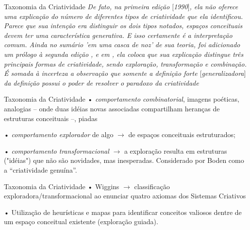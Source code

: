 \documentclass[aspectratio=169]{beamer}
\begin{document}
\begin{frame}{Taxonomia da Criatividade}
\emph{De fato, na primeira edição $[$1990$]$, ela não oferece uma explicação do número de diferentes tipos de criatividade que ela identificou. Parece que sua intenção era distinguir os dois tipos notados, espaços conceituais devem ter uma característica generativa. E isso certamente é a interpretação comum. Ainda no sumário 'em uma casca de noz' de sua teoria, foi adicionado um prólogo à segunda edição \cite{boden_creative_1990}, e em , ela coloca que sua explicação distingue três principais formas de criatividade, sendo exploração, transformação e \emph{combinação}. É somada à incerteza a observação que somente a definição forte $[$generalizadora$]$ da definição possui o poder de resolver o paradoxo da criatividade}
\end{frame}

\begin{frame}{Taxonomia da Criatividade}
• \emph{comportamento combinatorial}, imagens poéticas, analogias -- onde duas idéias novas associadas compartilham heranças de estruturas conceituais --, piadas \cite[p.~348]{boden_creativity_1998}

• \emph{comportamento explorador} de algo $\rightarrow$ de espaços conceituais estruturados;

• \emph{comportamento transformacional} $\rightarrow$ a exploração resulta em estruturas ("idéias") que não são novidades, mas inesperadas. Considerado por Boden como a ``criatividade genuína''.
\end{frame}

\begin{frame}{Taxonomia da Criatividade}
• Wiggins $\rightarrow$ classificação exploradora/transformacional ao enunciar quatro axiomas dos Sistemas Criativos  

• Utilização de heurísticas e mapas para identificar conceitos valiosos dentre de um espaço conceitual existente (exploração guiada). 
\end{frame}
\end{document}
